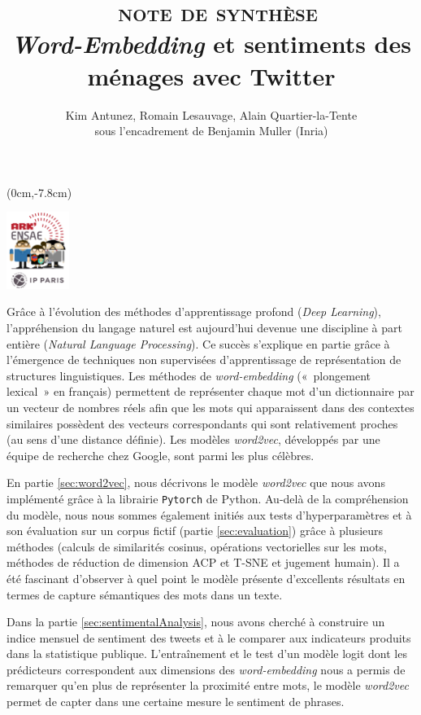 \documentclass[10pt,french,french]{article}
\title{~\textsc{note de synthèse}\\
\hspace*{0.333em}\emph{Word-Embedding} et sentiments des ménages avec Twitter}
\author{Kim Antunez, Romain Lesauvage, Alain Quartier-la-Tente\\
sous l'encadrement de Benjamin Muller (Inria)}
\date{}
\begin{document}
\maketitle


\begin{textblock*}{\textwidth}(0cm,-7.8cm)
\begin{center}
\includegraphics[height=2.5cm]{img/LOGO-ENSAE.png}
\end{center}
\end{textblock*}

Grâce à l'évolution des méthodes d'apprentissage profond (\emph{Deep Learning}), l'appréhension du langage naturel est aujourd'hui devenue une discipline à part entière (\emph{Natural Language Processing}).
Ce succès s'explique en partie grâce à l'émergence de techniques non supervisées d'apprentissage de représentation de structures linguistiques.
Les méthodes de \emph{word-embedding} («~plongement lexical~» en français) permettent de représenter chaque mot d'un dictionnaire par un vecteur de nombres réels afin que les mots qui apparaissent dans des contextes similaires possèdent des vecteurs correspondants qui sont relativement proches (au sens d'une distance définie).
Les modèles \emph{word2vec}, développés par une équipe de recherche chez Google, sont parmi les plus célèbres.

En partie \ref{sec:word2vec}, nous décrivons le modèle \emph{word2vec} que nous avons implémenté grâce à la librairie \texttt{Pytorch} de Python.
Au-delà de la compréhension du modèle, nous nous sommes également initiés aux tests d'hyperparamètres et à son évaluation sur un corpus fictif (partie \ref{sec:evaluation}) grâce à plusieurs méthodes (calculs de similarités cosinus, opérations vectorielles sur les mots, méthodes de réduction de dimension ACP et T-SNE et jugement humain).
Il a été fascinant d'observer à quel point le modèle présente d'excellents résultats en termes de capture sémantiques des mots dans un texte.

Dans la partie \ref{sec:sentimentalAnalysis}, nous avons cherché à construire un indice mensuel de sentiment des tweets et à le comparer aux indicateurs produits dans la statistique publique.
L'entraînement et le test d'un modèle logit dont les prédicteurs correspondent aux dimensions des \emph{word-embedding} nous a permis de remarquer qu'en plus de représenter la proximité entre mots, le modèle \emph{word2vec} permet de capter dans une certaine mesure le sentiment de phrases.
\end{document}
